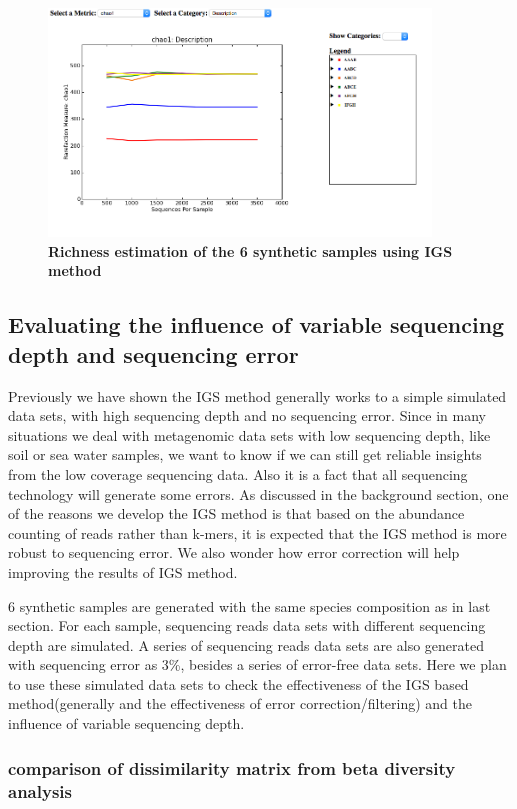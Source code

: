 \documentclass{article}
\begin{document}
\begin{figure}[!ht]
 \centerline{\includegraphics[width=4in]{./figures/simple_chao_alpha.png}}
\caption{\bf Richness estimation of the 6 synthetic samples using IGS method}
\label{fig:simple_alpha}
\end{figure}


\subsection{Evaluating the influence of variable sequencing depth and sequencing error}

Previously we have shown the IGS method generally works to a simple simulated data sets, with high sequencing depth and no sequencing error. Since
in many situations we deal with metagenomic data sets with low sequencing depth, like soil or sea water samples, we want to know if we can still 
get reliable insights from the low coverage sequencing data. Also it is a fact that all sequencing technology will generate some errors. As discussed in the background 
section, one of the reasons we develop the IGS method is that based on the abundance counting of reads rather than k-mers, it is expected that the IGS method 
is more robust to sequencing error. We also wonder how error correction will help improving the results of IGS method.

6 synthetic samples are generated with the same species composition as in last section. For each sample, sequencing reads data sets with different
sequencing depth are simulated. A series of sequencing reads data sets are also generated with sequencing error as 3\%, besides a series of error-free data sets.  Here we plan to use these simulated data sets to check the effectiveness of the IGS based method(generally 
and the effectiveness of error correction/filtering) and the influence of variable sequencing depth.

\subsubsection{comparison of dissimilarity matrix from beta diversity analysis}
\end{document}
